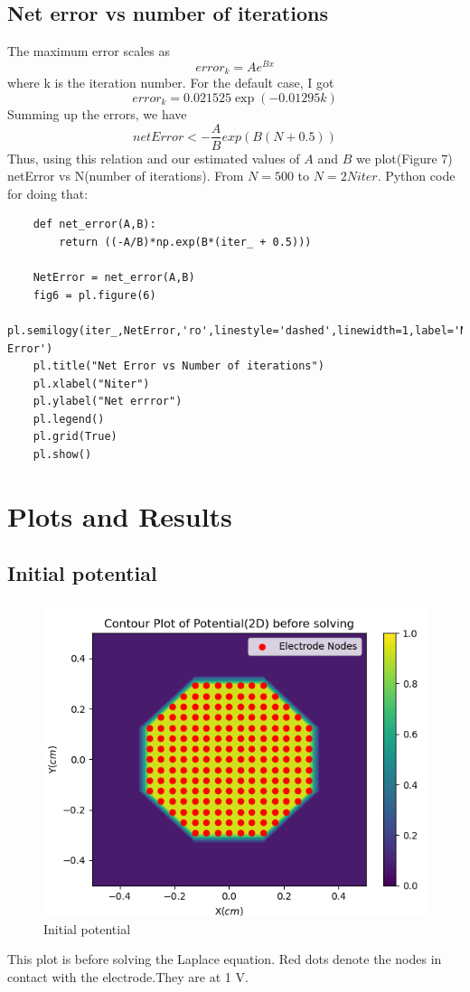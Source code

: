 \documentclass[11pt, a4paper]{article}
\begin{document}
    \subsection{Net error vs number of iterations}
    The maximum error scales as
    \begin{equation*}
        error_k = Ae^{Bx}
    \end{equation*}
    where k is the iteration number. For the default case, I got
    \begin{equation*}
        error_k = 0.021525\exp(-0.01295k)
    \end{equation*}
    Summing up the errors, we have
    \begin{equation*}
        netError < -\frac{A}{B}exp(B(N + 0.5))
    \end{equation*}
    Thus, using this relation and our estimated values of $A$ and $B$ we plot(Figure 7) netError vs N(number of iterations). From $N = 500$ to $N = 2Niter$. Python code for doing that:
    \begin{verbatim}
    def net_error(A,B):
        return ((-A/B)*np.exp(B*(iter_ + 0.5)))
    
    NetError = net_error(A,B)
    fig6 = pl.figure(6)
    pl.semilogy(iter_,NetError,'ro',linestyle='dashed',linewidth=1,label='Net Error')
    pl.title("Net Error vs Number of iterations")
    pl.xlabel("Niter")
    pl.ylabel("Net errror")
    pl.legend()
    pl.grid(True)
    pl.show()
    \end{verbatim}
\section{Plots and Results}
    \subsection{Initial potential}
    \begin{figure}[!h]
        \centering
        \includegraphics[scale = 0.7]{Figure1.png}
        \caption{Initial potential}
        \label{fig:Figure }
    \end{figure}
    This plot is before solving the Laplace equation. Red dots denote the nodes in contact with the electrode.They are at 1 V.
\end{document}
